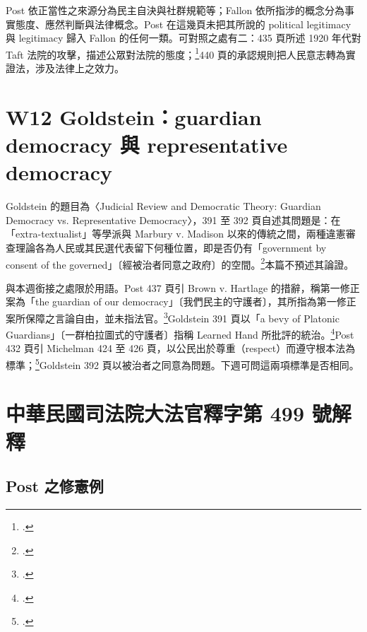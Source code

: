 Post 依正當性之來源分為民主自決與社群規範等；Fallon 依所指涉的概念分為事實態度、應然判斷與法律概念。Post 在這幾頁未把其所說的 political legitimacy 與 legitimacy 歸入 Fallon 的任何一類。可對照之處有二：435 頁所述 1920 年代對 Taft 法院的攻擊，描述公眾對法院的態度；\footcite[435]{post1998}440 頁的承認規則把人民意志轉為實證法，涉及法律上之效力。

\section{W12 Goldstein：guardian democracy 與 representative democracy}
\label{sec:80_comparison-4}

Goldstein 的題目為〈Judicial Review and Democratic Theory: Guardian Democracy vs. Representative Democracy〉，391 至 392 頁自述其問題是：在「extra-textualist」等學派與 Marbury v. Madison 以來的傳統之間，兩種違憲審查理論各為人民或其民選代表留下何種位置，即是否仍有「government by consent of the governed」〔經被治者同意之政府〕的空間。\footcite[391--392]{goldstein1987}本篇不預述其論證。

與本週銜接之處限於用語。Post 437 頁引 Brown v. Hartlage 的措辭，稱第一修正案為「the guardian of our democracy」〔我們民主的守護者〕，其所指為第一修正案所保障之言論自由，並未指法官。\footcite[437 \& n.30]{post1998}Goldstein 391 頁以「a bevy of Platonic Guardians」〔一群柏拉圖式的守護者〕指稱 Learned Hand 所批評的統治。\footcite[391]{goldstein1987}Post 432 頁引 Michelman 424 至 426 頁，以公民出於尊重（respect）而遵守根本法為標準；\footcite[432 \& nn.12--14]{post1998}Goldstein 392 頁以被治者之同意為問題。下週可問這兩項標準是否相同。

\section{中華民國司法院大法官釋字第 499 號解釋}
\label{sec:80_comparison-5}

\subsection{Post 之修憲例}


